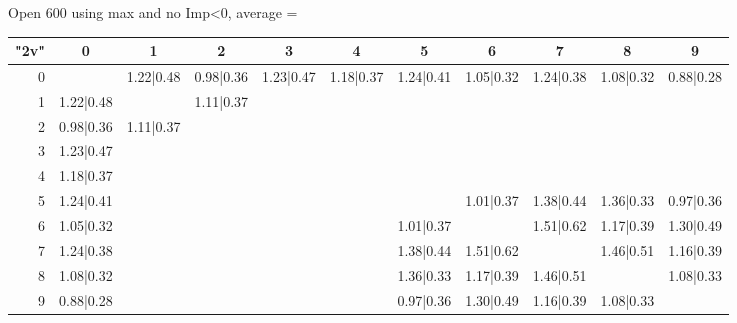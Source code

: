 \begin{table}
	
		\vspace{0.6cm}
	
		Open 600 using max and no Imp<0, average = 
	
	\begin{tabular}{|r||c|c|c|c|c|c|c|c|c|c|}\hline
		{\bf "2v"} & 0 & 1 & 2 & 3 & 4 & 5 & 6 & 7 & 8 & 9 \\\hline\hline
0 & &1.22|0.48 &0.98|0.36 &1.23|0.47 &1.18|0.37 &1.24|0.41 &1.05|0.32 &1.24|0.38 &1.08|0.32 &0.88|0.28  \\\hline
1 &1.22|0.48 & &1.11|0.37 & & & & & & &  \\\hline
2 &0.98|0.36 &1.11|0.37 & & & & & & & &  \\\hline
3 &1.23|0.47 & & & & & & & & &  \\\hline
4 &1.18|0.37 & & & & & & & & &  \\\hline
5 &1.24|0.41 & & & & & &1.01|0.37 &1.38|0.44 &1.36|0.33 &0.97|0.36  \\\hline
6 &1.05|0.32 & & & & &1.01|0.37 & &1.51|0.62 &1.17|0.39 &1.30|0.49  \\\hline
7 &1.24|0.38 & & & & &1.38|0.44 &1.51|0.62 & &1.46|0.51 &1.16|0.39  \\\hline
8 &1.08|0.32 & & & & &1.36|0.33 &1.17|0.39 &1.46|0.51 & &1.08|0.33  \\\hline
9 &0.88|0.28 & & & & &0.97|0.36 &1.30|0.49 &1.16|0.39 &1.08|0.33 &  \\\hline
	\end{tabular}
	
	

\end{table}


\clearpage

